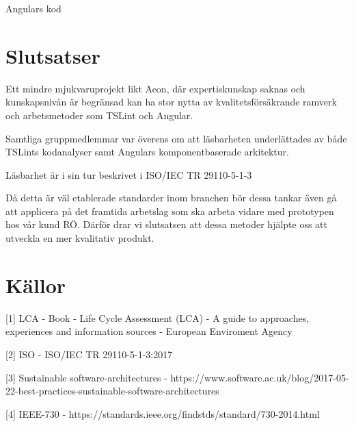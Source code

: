 Angulars kod

\section{Slutsatser}

Ett mindre mjukvaruprojekt likt Aeon, där expertiskunskap saknas och kunskapsnivån är begränsad kan ha stor nytta av kvalitetsförsäkrande ramverk och arbetsmetoder som TSLint och Angular. 

Samtliga gruppmedlemmar var överens om att läsbarheten underlättades av både TSLints kodanalyser samt Angulars komponentbaserade arkitektur.

Läsbarhet är i sin tur beskrivet i ISO/IEC TR 29110-5-1-3

Då detta är väl etablerade standarder inom branchen bör dessa tankar även gå att applicera på det framtida arbetslag som ska arbeta vidare med prototypen hos vår kund RÖ. Därför drar vi slutsatsen att dessa metoder hjälpte oss att utveckla en mer kvalitativ produkt.

\section{Källor}

[1] LCA - Book - Life Cycle Assessment (LCA) - A guide to approaches, experiences and information sources - European Enviroment Agency 

[2] ISO - ISO/IEC TR 29110-5-1-3:2017 

[3] Sustainable software-architectures -  https://www.software.ac.uk/blog/2017-05-22-best-practices-sustainable-software-architectures 

[4] IEEE-730 - https://standards.ieee.org/findstds/standard/730-2014.html 

